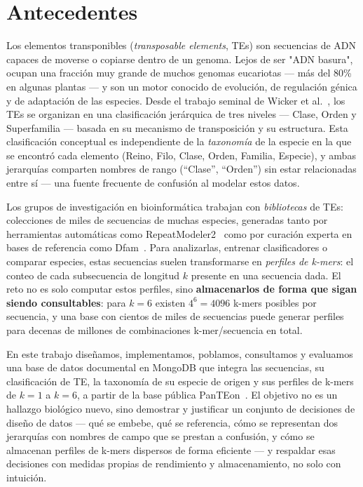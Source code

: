 \documentclass[pdflatex,sn-vancouver-num,lineno,referee]{sn-jnl}
\begin{document}

\maketitle

\section{Antecedentes}\label{sec:antecedentes}

Los elementos transponibles (\emph{transposable elements}, TEs) son secuencias
de ADN capaces de moverse o copiarse dentro de un genoma. Lejos de ser "ADN
basura", ocupan una fracción muy grande de muchos genomas eucariotas --- más
del 80\% en algunas plantas --- y son un motor conocido de evolución, de
regulación génica y de adaptación de las especies. Desde el trabajo seminal de
Wicker et al.~\cite{wicker2007}, los TEs se organizan en una clasificación
jerárquica de tres niveles --- Clase, Orden y Superfamilia --- basada en su
mecanismo de transposición y su estructura. Esta clasificación conceptual es
independiente de la \emph{taxonomía} de la especie en la que se encontró cada
elemento (Reino, Filo, Clase, Orden, Familia, Especie), y ambas jerarquías
comparten nombres de rango (``Clase'', ``Orden'') sin estar relacionadas entre
sí --- una fuente frecuente de confusión al modelar estos datos.

Los grupos de investigación en bioinformática trabajan con \emph{bibliotecas}
de TEs: colecciones de miles de secuencias de muchas especies, generadas tanto
por herramientas automáticas como RepeatModeler2~\cite{flynn2020repeatmodeler2}
como por curación experta en bases de referencia como
Dfam~\cite{storer2021dfam}. Para analizarlas, entrenar clasificadores o
comparar especies, estas secuencias suelen transformarse en \emph{perfiles de
k-mers}: el conteo de cada subsecuencia de longitud $k$ presente en una
secuencia dada. El reto no es solo computar estos perfiles, sino
\textbf{almacenarlos de forma que sigan siendo consultables}: para $k=6$ existen
$4^6=4096$ k-mers posibles por secuencia, y una base con cientos de miles de
secuencias puede generar perfiles para decenas de millones de combinaciones
k-mer/secuencia en total.

En este trabajo diseñamos, implementamos, poblamos, consultamos y evaluamos una
base de datos documental en MongoDB que integra las secuencias, su
clasificación de TE, la taxonomía de su especie de origen y sus perfiles de
k-mers de $k=1$ a $k=6$, a partir de la base pública
PanTEon~\cite{orozco2026panteon,panteon2026zenodo}. El objetivo no es un
hallazgo biológico nuevo, sino demostrar y justificar un conjunto de
decisiones de diseño de datos --- qué se embebe, qué se referencia, cómo se
representan dos jerarquías con nombres de campo que se prestan a confusión, y
cómo se almacenan perfiles de k-mers dispersos de forma eficiente --- y
respaldar esas decisiones con medidas propias de rendimiento y almacenamiento,
no solo con intuición.
\end{document}
